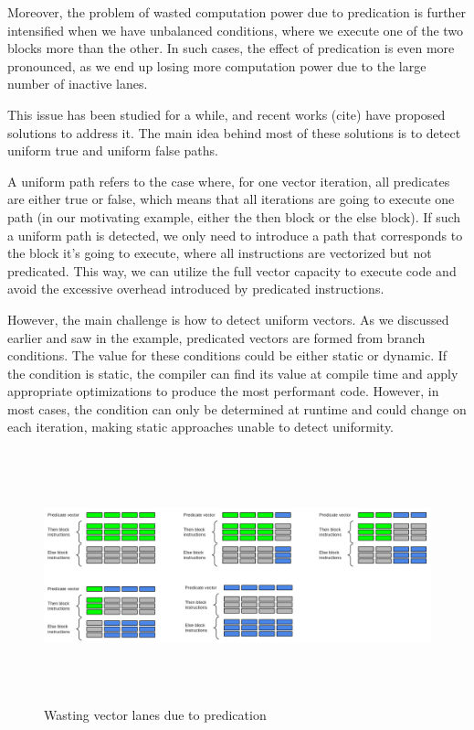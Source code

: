 \documentclass[\main/thesis.tex]{subfiles}
\begin{document}
Moreover, the problem of wasted computation power due to predication is further intensified when we have unbalanced conditions, where we execute one of the two blocks more than the other. In such cases, the effect of predication is even more pronounced, as we end up losing more computation power due to the large number of inactive lanes.

This issue has been studied for a while, and recent works (cite) have proposed solutions to address it. The main idea behind most of these solutions is to detect uniform true and uniform false paths.

A uniform path refers to the case where, for one vector iteration, all predicates are either true or false, which means that all iterations are going to execute one path (in our motivating example, either the then block or the else block). If such a uniform path is detected, we only need to introduce a path that corresponds to the block it's going to execute, where all instructions are vectorized but not predicated. This way, we can utilize the full vector capacity to execute code and avoid the excessive overhead introduced by predicated instructions.

However, the main challenge is how to detect uniform vectors. As we discussed earlier and saw in the example, predicated vectors are formed from branch conditions. The value for these conditions could be either static or dynamic. If the condition is static, the compiler can find its value at compile time and apply appropriate optimizations to produce the most performant code. However, in most cases, the condition can only be determined at runtime and could change on each iteration, making static approaches unable to detect uniformity.

\begin{figure}[t!]
    \centering
    \includegraphics[width=1.1\textwidth, height=7.3cm]{img/condition_distribution.png}
    \caption{Wasting vector lanes due to predication}
    \label{fig:Permutation}
\end{figure}
\end{document}
